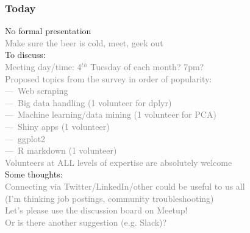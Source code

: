 \documentclass{beamer}
\newcommand{\si}[1]{\hspace{.5cm} \textcolor{gray} {#1}\\}
\newcommand{\sicont}[1]{\hspace{1cm} \textcolor{gray} {#1}\\}
\begin{document}
\small{

\begin{frame}[t]
\frametitle{Today}
No formal presentation\\
\si{Make sure the beer is cold, meet, geek out}
\vspace{.2cm}
To discuss: \\
\si{Meeting day/time: 4$^{th}$ Tuesday of each month? 7pm?}
\si{Proposed topics from the survey in order of popularity:}
\sicont{---~Web scraping}
\sicont{---~Big data handling (1 volunteer for dplyr)}
\sicont{---~Machine learning/data mining (1 volunteer for PCA)}
\sicont{---~Shiny apps (1 volunteer)}
\sicont{---~ggplot2}
\sicont{---~R markdown (1 volunteer)}
\si{Volunteers at ALL levels of expertise are absolutely welcome}
\vspace{.2cm}
Some thoughts: \\
\si{Connecting via Twitter/LinkedIn/other could be useful to us all}
\sicont{(I'm thinking job postings, community troubleshooting)}
\si{Let's please use the discussion board on Meetup!}
\sicont{Or is there another suggestion (e.g. Slack)?}
\begin{center}
\end{center}
\end{frame}

}
\end{document}
